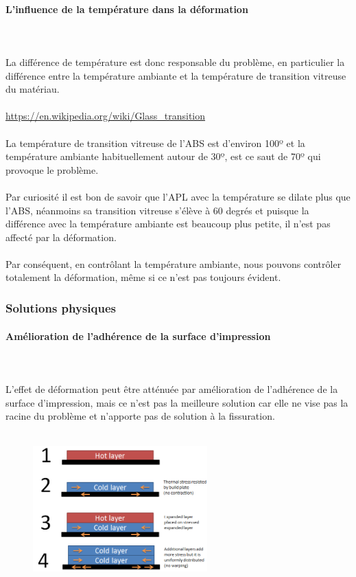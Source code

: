 \documentclass[11pt,a4paper]{article}
\begin{document}
			\paragraph{L’influence de la température dans la déformation}\mbox{}\\\\
La différence de température est donc responsable du problème, en particulier la différence entre la température ambiante et la température de transition vitreuse du matériau.
\\\\
\url{https://en.wikipedia.org/wiki/Glass_transition}
\\\\
La température de transition vitreuse de l'ABS est d'environ 100º et la température ambiante habituellement autour de 30º, est ce saut de 70º qui provoque le problème.
\\\\
Par curiosité il est bon de savoir que l’APL avec la température se dilate plus que l’ABS, néanmoins sa transition vitreuse s’élève à 60 degrés et puisque la différence avec la température ambiante est beaucoup plus petite, il n'est pas affecté par la déformation.
\\\\
Par conséquent, en contrôlant la température ambiante, nous pouvons contrôler totalement la déformation, même si ce n'est pas toujours évident.
		\subsubsection{Solutions physiques}
			\paragraph{Amélioration de l’adhérence de la surface d’impression}\mbox{}\\\\
L’effet de déformation peut être atténuée par amélioration de l’adhérence de la surface d’impression, mais ce n’est pas la meilleure solution car elle ne vise pas la racine du problème et n’apporte pas de solution à la fissuration.
\\\\
\begin{figure}[H]
\centering
\includegraphics[width=0.6\textwidth,cfbox=azul_marcos 4pt 0pt]{FOTOS/CAUSA_WARPING_2}
\end{figure}
\end{document}
